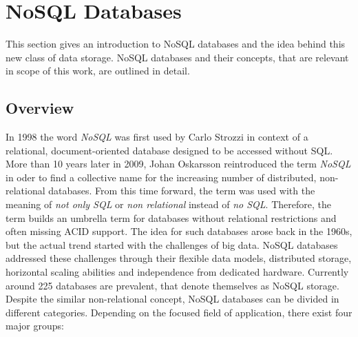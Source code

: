 \section{NoSQL Databases}
This section gives an introduction to NoSQL databases and the idea behind this new class of data storage. NoSQL databases and their concepts, that are relevant in scope of this work, are outlined in detail.

\subsection{Overview}
In 1998 the word \textit{NoSQL} was first used by Carlo Strozzi in context of a relational, document-oriented database designed to be accessed without SQL. More than 10 years later in 2009, Johan Oskarsson reintroduced the term \textit{NoSQL} in oder to find a collective name for the increasing number of distributed, non-relational databases. From this time forward, the term was used with the meaning of \textit{not only SQL} or \textit{non relational} instead of \textit{no SQL}. Therefore, the term builds an umbrella term for databases without relational restrictions and often missing ACID support. The idea for such databases arose back in the 1960s, but the actual trend started with the challenges of big data. NoSQL databases addressed these challenges through their flexible data models, distributed storage, horizontal scaling abilities and independence from dedicated hardware. Currently around 225 databases are prevalent, that denote themselves as NoSQL storage. Despite the similar non-relational concept, NoSQL databases can be divided in different categories. Depending on the focused field of application, there exist four major groups:

